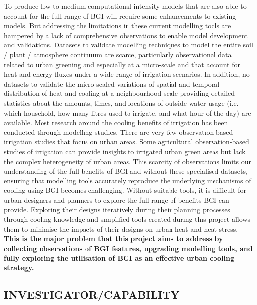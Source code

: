 To produce low to medium computational intensity models that are also able to account for the full range of BGI will require some enhancements to existing models. But addressing the limitations in these current modelling tools are hampered by a lack of comprehensive observations to enable model development and validations. Datasets to validate modelling techniques to model the entire soil / plant / atmosphere continuum are scarce\cite{Pataki2013}, particularly observational data related to urban greening and especially at a micro-scale and that account for heat and energy fluxes under a wide range of irrigation scenarios. In addition, no datasets to validate the micro-scaled variations of spatial and temporal distribution of heat and cooling at a neighbourhood scale providing detailed statistics about the amounts, times, and locations of outside water usage (i.e. which household, how many litres used to irrigate, and what hour of the day) are available. Most research around the cooling benefits of irrigation has been conducted through modelling studies\cite{Kanamaru2008,Yang2015a,Broadbent2018a}. There are very few observation-based irrigation studies that focus on urban areas\cite{Broadbent2017a}. Some agricultural observation-based studies of irrigation\cite{Chen2018b} can provide insights to irrigated urban green areas but lack the complex heterogeneity of urban areas. This scarcity of observations limits our understanding of the full benefits of BGI and without these specialised datasets, ensuring that modelling tools accurately reproduce the underlying mechanisms of cooling using BGI becomes challenging. Without suitable tools, it is difficult for urban designers and planners to explore the full range of benefits BGI can provide. Exploring their designs iteratively during their planning processes through cooling knowledge and simplified tools created during this project allows them to minimise the impacts of their designs on urban heat and heat stress. \textbf{This is the major problem that this project aims to address by collecting observations of BGI features, upgrading modelling tools, and fully exploring the utilisation of BGI as an effective urban cooling strategy.}

\subsection*{\TitleFont INVESTIGATOR/CAPABILITY}


